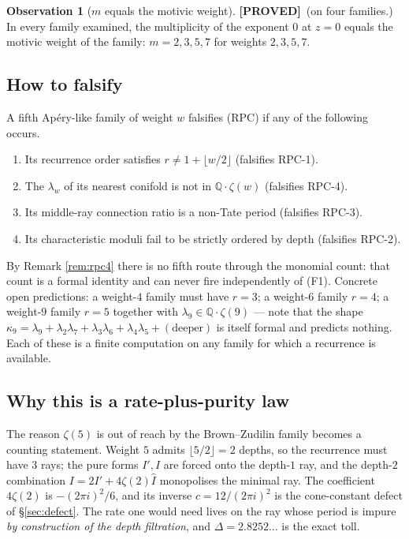 \documentclass[11pt,reqno]{amsart}
\theoremstyle{plain}
\theoremstyle{definition}
\newtheorem{observation}[theorem]{Observation}
\theoremstyle{remark}
\newcommand{\PROVED}{{\normalfont\sffamily\bfseries[PROVED]}}
\newcommand{\QQ}{\mathbb{Q}}
\newcommand{\Ihat}{\widehat{I}}
\begin{document}
\begin{observation}[$m$ equals the motivic weight]\label{obs:mweight} \PROVED\ (on four
families.)
In every family examined, the multiplicity of the exponent $0$ at $z=0$ equals the motivic weight
of the family: $m=2,3,5,7$ for weights $2,3,5,7$.
\end{observation}

\subsection{How to falsify}\label{sec:falsify}
A fifth Ap\'ery-like family of weight $w$ falsifies (RPC) if any of the following occurs.
\begin{enumerate}[label=(F\arabic*),leftmargin=2.6em]
\item Its recurrence order satisfies $r\ne 1+\lfloor w/2\rfloor$ (falsifies RPC-1).
\item The $\lambda_w$ of its nearest conifold is not in $\QQ\cdot\zeta(w)$ (falsifies RPC-4).
\item Its middle-ray connection ratio is a non-Tate period (falsifies RPC-3).
\item Its characteristic moduli fail to be strictly ordered by depth (falsifies RPC-2).
\end{enumerate}
By Remark \ref{rem:rpc4} there is no fifth route through the monomial count: that count is a
formal identity and can never fire independently of (F1).
Concrete open predictions: a weight-$4$ family must have $r=3$; a weight-$6$ family $r=4$; a
weight-$9$ family $r=5$ together with $\lambda_9\in\QQ\cdot\zeta(9)$ --- note that the shape
$\kappa_9=\lambda_9+\lambda_2\lambda_7+\lambda_3\lambda_6+\lambda_4\lambda_5+(\text{deeper})$
is itself formal and predicts nothing.
Each of these is a finite computation on any family for which a recurrence is available.

\subsection{Why this is a rate-plus-purity law}
The reason $\zeta(5)$ is out of reach by the Brown--Zudilin family becomes a counting statement.
Weight $5$ admits $\lfloor5/2\rfloor=2$ depths, so the recurrence must have $3$ rays; the pure
forms $I',\Ihat$ are forced onto the depth-$1$ ray, and the depth-$2$ combination
$I=2I'+4\zeta(2)\Ihat$ monopolises the minimal ray. The coefficient $4\zeta(2)$ is
$-(2\pi i)^2/6$, and its inverse $c=12/(2\pi i)^2$ is the cone-constant defect of
\S\ref{sec:defect}. The rate one would need lives on the ray whose period is impure \emph{by
construction of the depth filtration}, and $\Delta=2.8252\ldots$ is the exact toll.
\end{document}
